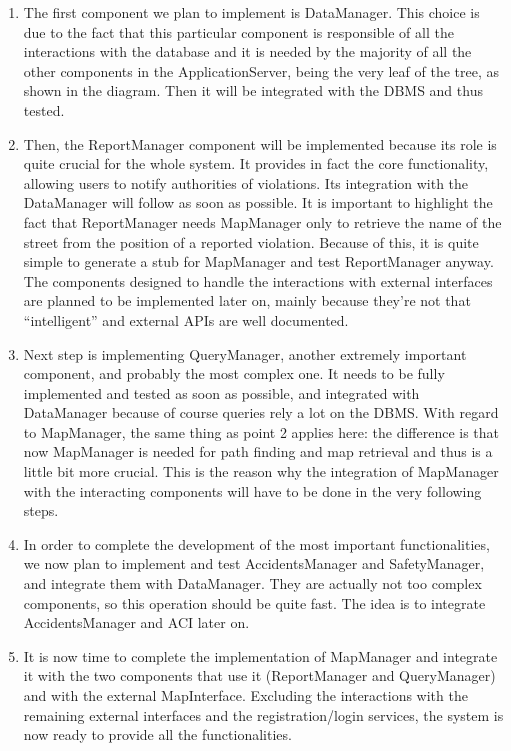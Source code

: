 		\begin{enumerate}
			\item The first component we plan to implement is DataManager. This choice is due to the fact that this particular component is responsible of all the interactions with the database and it is needed by the majority of all the other components in the ApplicationServer, being the very leaf of the tree, as shown in the diagram. Then it will be integrated with the DBMS and thus tested.
			
			\item Then, the ReportManager component will be implemented because its role is quite crucial for the whole system. It provides in fact the core functionality, allowing users to notify authorities of violations. Its integration with the DataManager will follow as soon as possible. It is important to highlight the fact that ReportManager needs MapManager only to retrieve the name of the street from the position of a reported violation. Because of this, it is quite simple to generate a stub for MapManager and test ReportManager anyway. The components designed to handle the interactions with external interfaces are planned to be implemented later on, mainly because they’re not that “intelligent” and external APIs are well documented. 
			
			\item Next step is implementing QueryManager, another extremely important component, and probably the most complex one. It needs to be fully implemented and tested as soon as possible, and integrated with DataManager because of course queries rely a lot on the DBMS. With regard to MapManager, the same thing as point 2 applies here: the difference is that now MapManager is needed for path finding and map retrieval and thus is a little bit more crucial. This is the reason why the integration of MapManager with the interacting components will have to be done in the very following steps.
			
			\item In order to complete the development of the most important functionalities, we now plan to implement and test AccidentsManager and SafetyManager, and integrate them with DataManager. They are actually not too complex components, so this operation should be quite fast. The idea is to integrate AccidentsManager and ACI later on.
			
			\item It is now time to complete the implementation of MapManager and integrate it with the two components that use it (ReportManager and QueryManager) and with the external MapInterface. Excluding the interactions with the remaining external interfaces and the registration/login services, the system is now ready to provide all the functionalities.
			

\end{enumerate}
